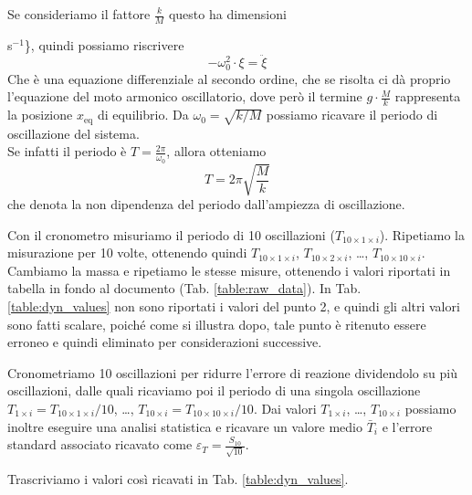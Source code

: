\documentclass[italian, a4paper, 10pt, twocolumn]{../../style/lab_unige}
\newcommand{\reftab}[1]{Tab. {\ref{#1}}}%
\newcommand{\Ti}[1]{$T_{#1}$}
\begin{document}
    Se consideriamo il fattore $\frac{k}{M}$ questo ha dimensioni {s$^{-1}$\}, quindi possiamo riscrivere
    \[
        - \omega^2_0 \cdot \xi = \ddot{\xi}
    \]
    Che è una equazione differenziale al secondo ordine, che se risolta ci dà proprio l'equazione del moto 
    armonico oscillatorio, dove però il termine $g \cdot \frac{M}{k}$ rappresenta la posizione $x_{\text{eq}}$
    di equilibrio. Da $\omega_0 = \sqrt{k/M}$ possiamo ricavare il periodo di oscillazione del sistema.\\
    Se infatti il periodo è $T = \frac{2 \pi}{\omega_0}$, allora otteniamo
    \[
        T = 2 \pi \sqrt{\frac{M}{k}}
    \]
    che denota la non dipendenza del periodo dall'ampiezza di oscillazione. 

    Con il cronometro misuriamo il periodo di 10 oscillazioni (\Ti{10\times1\times i}). Ripetiamo la misurazione
    per 10 volte, ottenendo quindi \Ti{10\times1\times i}, \Ti{10\times2\times i}, \ldots , 
    \Ti{10\times10\times i}.\\
    Cambiamo la massa e ripetiamo le stesse misure, ottenendo i valori riportati in tabella in fondo al 
    documento (\reftab{table:raw_data}). In \reftab{table:dyn_values} non sono riportati i valori del punto 2, e 
    quindi gli altri valori sono fatti scalare, poiché come si illustra dopo, tale punto è ritenuto essere erroneo
    e quindi eliminato per considerazioni successive.%

    Cronometriamo 10 oscillazioni per ridurre l'errore di reazione dividendolo su più oscillazioni, dalle 
    quali ricaviamo poi il periodo di una singola oscillazione $T_{1\times i} = T_{10\times1\times i}/10$, \ldots ,
    $T_{10\times i} = T_{10\times10\times i}/10$.
    Dai valori $T_{1\times i}$, \ldots, $T_{10\times i}$ possiamo inoltre eseguire una analisi statistica e 
    ricavare un valore medio $\bar{T}_i$ e l'errore standard associato ricavato come 
    $\varepsilon_T = \frac{S_{10}}{\sqrt{10}}$. 
    
    Trascriviamo i valori così ricavati in \reftab{table:dyn_values}.

}
\end{document}
